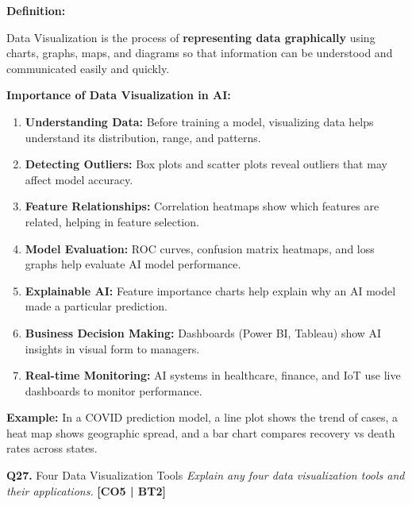 \documentclass[12pt,a4paper]{article}
\newcommand{\Qno}[1]{\textbf{\color{darkred}Q#1.}}
\newcommand{\term}[1]{\textbf{\color{headingcolor}#1}}
\begin{document}
\begin{answerenv}

\textbf{\color{headingcolor}Definition:}

Data Visualization is the process of \textbf{representing data graphically} using charts, graphs, maps, and diagrams so that information can be understood and communicated easily and quickly.

\vspace{6pt}
\textbf{\color{headingcolor}Importance of Data Visualization in AI:}
\begin{enumerate}[leftmargin=1.8em, itemsep=4pt]
  \item \term{Understanding Data:} Before training a model, visualizing data helps understand its distribution, range, and patterns.
  \item \term{Detecting Outliers:} Box plots and scatter plots reveal outliers that may affect model accuracy.
  \item \term{Feature Relationships:} Correlation heatmaps show which features are related, helping in feature selection.
  \item \term{Model Evaluation:} ROC curves, confusion matrix heatmaps, and loss graphs help evaluate AI model performance.
  \item \term{Explainable AI:} Feature importance charts help explain why an AI model made a particular prediction.
  \item \term{Business Decision Making:} Dashboards (Power BI, Tableau) show AI insights in visual form to managers.
  \item \term{Real-time Monitoring:} AI systems in healthcare, finance, and IoT use live dashboards to monitor performance.
\end{enumerate}

\begin{keypoint}
\textbf{Example:} In a COVID prediction model, a line plot shows the trend of cases, a heat map shows geographic spread, and a bar chart compares recovery vs death rates across states.
\end{keypoint}

\end{answerenv}

\vspace{8pt}

\begin{questionbox}{\Qno{27} Four Data Visualization Tools}
\textit{Explain any four data visualization tools and their applications.} \hfill \textbf{[CO5 | BT2]}
\end{questionbox}
\end{document}
